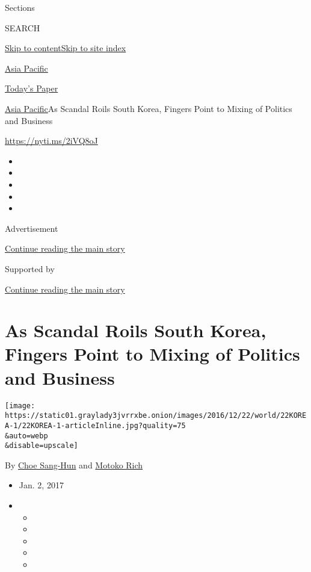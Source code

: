 Sections

SEARCH

\protect\hyperlink{site-content}{Skip to
content}\protect\hyperlink{site-index}{Skip to site index}

\href{https://www.nytimes3xbfgragh.onion/section/world/asia}{Asia
Pacific}

\href{https://myaccount.nytimes3xbfgragh.onion/auth/login?response_type=cookie\&client_id=vi}{}

\href{https://www.nytimes3xbfgragh.onion/section/todayspaper}{Today's
Paper}

\href{/section/world/asia}{Asia Pacific}\textbar{}As Scandal Roils South
Korea, Fingers Point to Mixing of Politics and Business

\url{https://nyti.ms/2iVQ8oJ}

\begin{itemize}
\item
\item
\item
\item
\item
\end{itemize}

Advertisement

\protect\hyperlink{after-top}{Continue reading the main story}

Supported by

\protect\hyperlink{after-sponsor}{Continue reading the main story}

\hypertarget{as-scandal-roils-south-korea-fingers-point-to-mixing-of-politics-and-business}{%
\section{As Scandal Roils South Korea, Fingers Point to Mixing of
Politics and
Business}\label{as-scandal-roils-south-korea-fingers-point-to-mixing-of-politics-and-business}}

\texttt{[image: https://static01.graylady3jvrrxbe.onion/images/2016/12/22/world/22KOREA-1/22KOREA-1-articleInline.jpg?quality=75\\\&auto=webp\\\&disable=upscale]}

By \href{http://www.nytimes3xbfgragh.onion/by/choe-sang-hun}{Choe
Sang-Hun} and
\href{http://www.nytimes3xbfgragh.onion/by/motoko-rich}{Motoko Rich}

\begin{itemize}
\item
  Jan. 2, 2017
\item
  \begin{itemize}
  \item
  \item
  \item
  \item
  \item
  \end{itemize}
\end{itemize}

